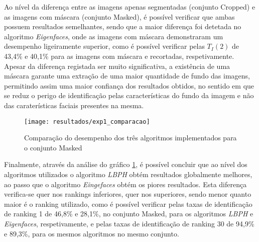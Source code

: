 Ao nível da diferença entre as imagens apenas segmentadas (conjunto Cropped) e as imagens com máscara (conjunto Masked), é possível verificar que ambas possuem resultados semelhantes, sendo que a maior diferença foi detetada no algoritmo \textit{Eigenfaces}, onde as imagens com máscara demonstraram um desempenho ligeiramente superior, como é possível verificar pelas $T_{I}(2)$ de 43,4\% e 40,1\% para as imagens com máscara e recortadas, respetivamente. Apesar da diferença registada ser muito significativa, a existência de uma máscara garante uma extração de uma maior quantidade de fundo das imagens, permitindo assim uma maior confiança dos resultados obtidos, no sentido em que se reduz o perigo de identificação pelas características do fundo da imagem e não das caraterísticas faciais presentes na mesma. 

\begin{figure}[ht]
  \begin{center}
    \leavevmode
    \texttt{[image: resultados/exp1\_comparacao]}
    \caption{Comparação do desempenho dos três algoritmos implementados para o conjunto Masked}
    \label{fig:exp1_comaparacao}
  \end{center}
\end{figure}

Finalmente, através da análise do gráfico \ref{fig:exp1_comaparacao}, é possível concluir que ao nível dos algoritmos utilizados o algoritmo \textit{LBPH} obtém resultados globalmente melhores, ao passo que o algoritmo \textit{Eingefaces} obtém os piores resultados. Esta diferença verifica-se quer nos rankings inferiores, quer nos superiores, sendo menor quanto maior é o ranking utilizado, como é possível verificar pelas taxas de identificação de ranking 1 de 46,8\% e 28,1\%, no conjunto Masked, para os algoritmos \textit{LBPH} e \textit{Eigenfaces}, respetivamente, e pelas taxas de identificação de ranking 30 de 94,9\% e 89,3\%, para os mesmos algoritmos no mesmo conjunto.

